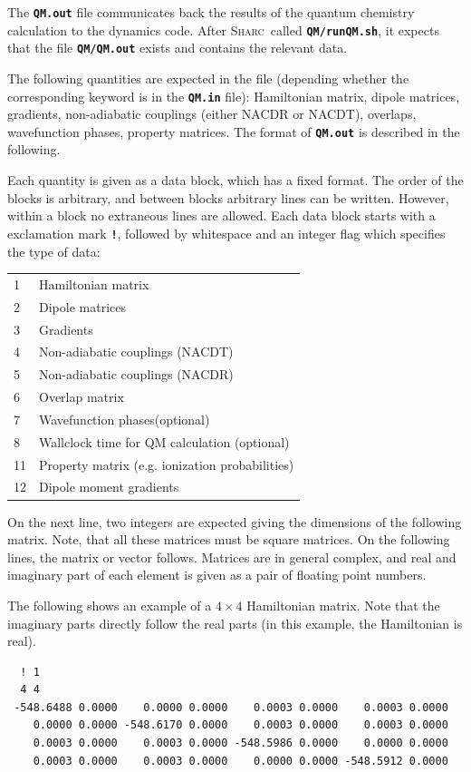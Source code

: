 \documentclass[a4paper,11pt,DIV=15,openany,twoside=false]{scrbook}
\newcommand{\sharc}{\textsc{Sharc}}
\newcommand{\ttt}[1]{\textbf{\texttt{#1}}}
\newenvironment{example}{
  \vspace{0mm}
  \definecolor{shadecolor}{HTML}{BBDDFF}
  \begin{shaded}
  \begin{minipage}{0.9\textwidth}
}{
  \end{minipage}
  \end{shaded}
}
\begin{document}
The \ttt{QM.out} file communicates back the results of the quantum chemistry calculation to the dynamics code. After \sharc\ called \ttt{QM/runQM.sh}, it expects that the file \ttt{QM/QM.out} exists and contains the relevant data.

The following quantities are expected in the file (depending whether the corresponding keyword is in the \ttt{QM.in} file): Hamiltonian matrix, dipole matrices, gradients, non-adiabatic couplings (either NACDR or NACDT), overlaps, wavefunction phases, property matrices. The format of \ttt{QM.out} is described in the following. 

Each quantity is given as a data block, which has a fixed format. The order of the blocks is arbitrary, and between blocks arbitrary lines can be written. However, within a block no extraneous lines are allowed. Each data block starts with a exclamation mark \ttt{!}, followed by whitespace and an integer flag which specifies the type of data:

\begin{tabular}{ll}
1       &Hamiltonian matrix\\
2       &Dipole matrices\\
3       &Gradients\\
4       &Non-adiabatic couplings (NACDT)\\
5       &Non-adiabatic couplings (NACDR)\\
6       &Overlap matrix\\
7       &Wavefunction phases(optional)\\
8       &Wallclock time for QM calculation (optional)\\
11      &Property matrix (e.g. ionization probabilities)\\
12      &Dipole moment gradients\\
\end{tabular}

On the next line, two integers are expected giving the dimensions of the following matrix. Note, that all these matrices must be square matrices. On the following lines, the matrix or vector follows. Matrices are in general complex, and real and imaginary part of each element is given as a pair of floating point numbers.

The following shows an example of a $4\times 4$ Hamiltonian matrix. Note that the imaginary parts directly follow the real parts (in this example, the Hamiltonian is real).
\begin{example}
  \begin{verbatim}
  ! 1
  4 4
 -548.6488 0.0000    0.0000 0.0000    0.0003 0.0000    0.0003 0.0000
    0.0000 0.0000 -548.6170 0.0000    0.0003 0.0000    0.0003 0.0000
    0.0003 0.0000    0.0003 0.0000 -548.5986 0.0000    0.0000 0.0000
    0.0003 0.0000    0.0003 0.0000    0.0000 0.0000 -548.5912 0.0000
  \end{verbatim}
\end{example}
\end{document}
